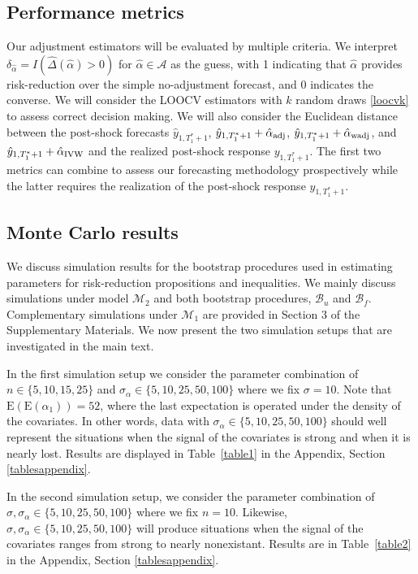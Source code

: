\documentclass[11pt,3p,review,authoryear]{elsarticle}
\def\mc#1{\mathcal{#1}} %
\def\E#1{\mathrm{E}(#1)} %
\theoremstyle{definition}
\begin{document}
\subsection{Performance metrics}

Our adjustment estimators will be evaluated by multiple criteria. We interpret $\delta_{\hat{\alpha}}= I(\hat{\Delta}(\hat{\alpha})>0)$ for $\hat{\alpha}\in \mc{A}$ as the guess, with 1 indicating that $\hat{\alpha}$ provides risk-reduction over the simple no-adjustment forecast, and 0 indicates the converse. We will consider the LOOCV estimators with $k$ random draws \eqref{loocvk} to assess correct decision making. We will also consider the Euclidean distance between the post-shock forecasts $\hat{y}_{1,T_1^*+1}$, $\hat{y}_{1,T_1^*+1}+ \hat{\alpha}_{\rm adj}$, $\hat{y}_{1,T_1^*+1}+\hat{\alpha}_{\rm wadj}$, and $\hat{y}_{1,T_1^*+1}+\hat{\alpha}_{\rm IVW}$ and the realized post-shock response $y_{1,T_1^*+1}$. The first two metrics can combine to assess our forecasting methodology prospectively while the latter requires the realization of the post-shock response $y_{1,T_1^*+1}$. 



\subsection{Monte Carlo results}
\label{parametricbootstrapsimulation}

We discuss simulation results for the bootstrap procedures used in estimating parameters for risk-reduction propositions and inequalities. We mainly discuss simulations under model $\mc{M}_2$ and both bootstrap procedures, $\mc{B}_u$ and $\mc{B}_f$. Complementary simulations under $\mc{M}_1$ are provided in Section 3 of the Supplementary Materials. We now present the two simulation setups that are investigated in the main text. 

In the first simulation setup we consider the parameter combination of  $n \in \{5, 10, 15, 25\}$ and $\sigma_{\alpha} \in  \{5, 10, 25, 50, 100\}$ where we fix $\sigma=10$. Note that $\E{\E{\alpha_1}}=52$, where the last expectation is operated under the density of the covariates. In other words, data with $\sigma_{\alpha} \in  \{5, 10, 25, 50, 100\}$  should well represent the situations when the signal of the covariates is strong and when it is nearly lost. Results are displayed in Table~\ref{table1} in the Appendix, Section \ref{tablesappendix}.


In the second simulation setup, we consider the parameter combination of $\sigma, \sigma_{\alpha} \in  \{5, 10, 25, 50, 100\}$ where we fix $n=10$. Likewise, $\sigma, \sigma_{\alpha} \in  \{5, 10, 25, 50, 100\}$ will produce situations when the signal of the covariates ranges from strong to nearly nonexistant. Results are  in Table~\ref{table2} in the Appendix, Section \ref{tablesappendix}.
\end{document}

